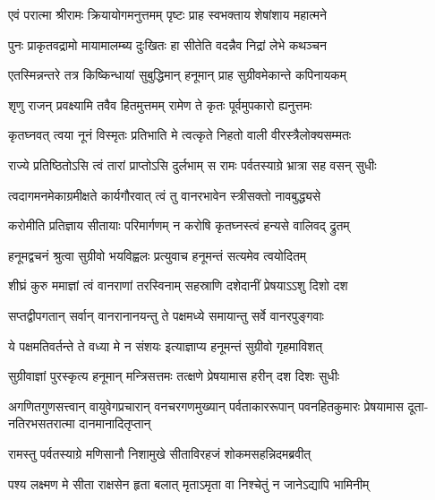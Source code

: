 \twolineshloka
{एवं परात्मा श्रीरामः क्रियायोगमनुत्तमम्}
{पृष्टः प्राह स्वभक्ताय शेषांशाय महात्मने} %

\twolineshloka
{पुनः प्राकृतवद्रामो मायामालम्ब्य दुःखितः}
{हा सीतेति वदन्नैव निद्रां लेभे कथञ्चन} %

\twolineshloka
{एतस्मिन्नन्तरे तत्र किष्किन्धायां सुबुद्धिमान्}
{हनूमान् प्राह सुग्रीवमेकान्ते कपिनायकम्} %

\twolineshloka
{शृणु राजन् प्रवक्ष्यामि तवैव हितमुत्तमम्}
{रामेण ते कृतः पूर्वमुपकारो ह्यनुत्तमः} %

\twolineshloka
{कृतघ्नवत् त्वया नूनं विस्मृतः प्रतिभाति मे}
{त्वत्कृते निहतो वाली वीरस्त्रैलोक्यसम्मतः} %

\twolineshloka
{राज्ये प्रतिष्ठितोऽसि त्वं तारां प्राप्तोऽसि दुर्लभाम्}
{स रामः पर्वतस्याग्रे भ्रात्रा सह वसन् सुधीः} %

\twolineshloka
{त्वदागमनमेकाग्रमीक्षते कार्यगौरवात्}
{त्वं तु वानरभावेन स्त्रीसक्तो नावबुद्ध्यसे} %

\twolineshloka
{करोमीति प्रतिज्ञाय सीतायाः परिमार्गणम्}
{न करोषि कृतघ्नस्त्वं हन्यसे वालिवद् द्रुतम्} %

\twolineshloka
{हनूमद्वचनं श्रुत्वा सुग्रीवो भयविह्वलः}
{प्रत्युवाच हनूमन्तं सत्यमेव त्वयोदितम्} %

\twolineshloka
{शीघ्रं कुरु ममाज्ञां त्वं वानराणां तरस्विनाम्}
{सहस्राणि दशेदानीं प्रेषयाऽऽशु दिशो दश} %

\twolineshloka
{सप्तद्वीपगतान् सर्वान् वानरानानयन्तु ते}
{पक्षमध्ये समायान्तु सर्वे वानरपुङ्गवाः} %

\twolineshloka
{ये पक्षमतिवर्तन्ते ते वध्या मे न संशयः}
{इत्याज्ञाप्य हनूमन्तं सुग्रीवो गृहमाविशत्} %

\twolineshloka
{सुग्रीवाज्ञां पुरस्कृत्य हनूमान् मन्त्रिसत्तमः}
{तत्क्षणे प्रेषयामास हरीन् दश दिशः सुधीः} %

\fourlineindentedshloka
{अगणितगुणसत्त्वान् वायुवेगप्रचारान्}
{वनचरगणमुख्यान् पर्वताकाररूपान्}
{पवनहितकुमारः प्रेषयामास दूता-}
{नतिरभसतरात्मा दानमानादितृप्तान्} %





\twolineshloka
{रामस्तु पर्वतस्याग्रे मणिसानौ निशामुखे}
{सीताविरहजं शोकमसहन्निदमब्रवीत्} %

\twolineshloka
{पश्य लक्ष्मण मे सीता राक्षसेन हृता बलात्}
{मृताऽमृता वा निश्चेतुं न जानेऽद्यापि भामिनीम्} %

